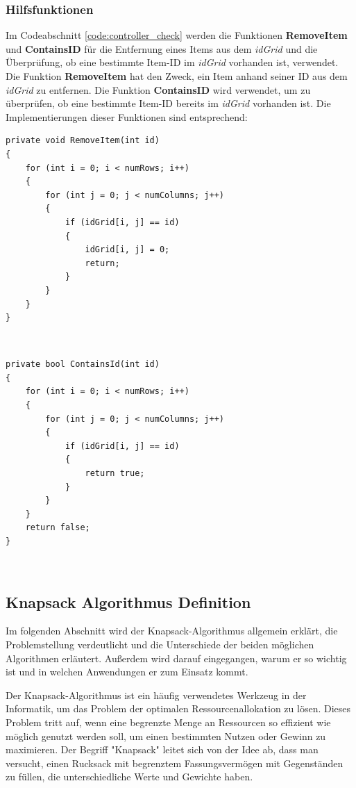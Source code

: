 \subsubsection{Hilfsfunktionen}
Im Codeabschnitt \ref{code:controller_check} werden die Funktionen \textbf{RemoveItem} und \textbf{ContainsID} für die
Entfernung eines Items aus dem \textit{idGrid} und die Überprüfung, ob eine bestimmte Item-ID im \textit{idGrid}
vorhanden ist, verwendet. Die Funktion \textbf{RemoveItem} hat den Zweck, ein Item anhand seiner ID aus dem \textit{idGrid} zu entfernen.
Die Funktion \textbf{ContainsID} wird verwendet, um zu überprüfen, ob eine bestimmte Item-ID bereits im \textit{idGrid}
vorhanden ist. Die Implementierungen dieser Funktionen sind entsprechend:
\begin{lstlisting}[style=csharp, caption={ID aus idGrid entfernen}, label=code:controller_removeID]
private void RemoveItem(int id)
{
    for (int i = 0; i < numRows; i++)
    {
        for (int j = 0; j < numColumns; j++)
        {
            if (idGrid[i, j] == id)
            {
                idGrid[i, j] = 0;
                return;
            }
        }
    }
}
\end{lstlisting}\\
\begin{lstlisting}[style=csharp, caption={Ueberpruefen ob ID in idGrid enthalten ist}, label=code:controller_contains ID]
private bool ContainsId(int id)
{
    for (int i = 0; i < numRows; i++)
    {
        for (int j = 0; j < numColumns; j++)
        {
            if (idGrid[i, j] == id)
            {
                return true;
            }
        }
    }
    return false;
}
\end{lstlisting}\\

\subsection{Knapsack Algorithmus Definition}
Im folgenden Abschnitt wird der Knapsack-Algorithmus allgemein erklärt, die Problemstellung verdeutlicht und die
Unterschiede der beiden möglichen Algorithmen erläutert. Außerdem wird darauf eingegangen, warum er so wichtig ist
und in welchen Anwendungen er zum Einsatz kommt.

Der Knapsack-Algorithmus ist ein häufig verwendetes Werkzeug in der Informatik, um das Problem der optimalen
Ressourcenallokation zu lösen. Dieses Problem tritt auf, wenn eine begrenzte Menge an Ressourcen so effizient wie
möglich genutzt werden soll, um einen bestimmten Nutzen oder Gewinn zu maximieren. Der Begriff "Knapsack" leitet sich
von der Idee ab, dass man versucht, einen Rucksack mit begrenztem Fassungsvermögen mit Gegenständen zu füllen, die
unterschiedliche Werte und Gewichte haben.

